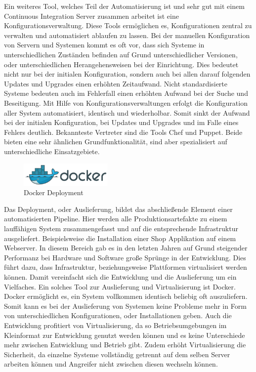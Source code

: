 Ein weiteres Tool, welches Teil der Automatisierung ist und sehr gut mit einem Continuous Integration Server zusammen arbeitet ist eine Konfigurationsverwaltung. Diese Tools ermöglichen es, Konfigurationen zentral zu verwalten und automatisiert ablaufen zu lassen. Bei der manuellen Konfiguration von Servern und Systemen kommt es oft vor, dass sich Systeme in unterschiedlichen Zuständen befinden auf Grund unterschiedlicher Versionen, oder unterschiedlichen Herangehensweisen bei der Einrichtung. Dies bedeutet nicht nur bei der initialen Konfiguration, sondern auch bei allen darauf folgenden Updates und Upgrades einen erhöhten Zeitaufwand. Nicht standardisierte Systeme bedeuten auch im Fehlerfall einen erhöhten Aufwand bei der Suche und Beseitigung. Mit Hilfe von Konfigurationsverwaltungen erfolgt die Konfiguration aller System automatisiert, identisch und wiederholbar. Somit sinkt der Aufwand bei der initialen Konfiguration, bei Updates und Upgrades und im Falle eines Fehlers deutlich. Bekannteste Vertreter sind die Tools Chef und Puppet. Beide bieten eine sehr ähnlichen Grundfunktionalität, sind aber spezialisiert auf unterschiedliche Einsatzgebiete. \parencite[Vgl.][S. 1 ff.]{krum:2014} \parencite[Vgl.][S. 8 ff.]{taylor:2014}

\begin{figure}[ht]
  \centering
  \includegraphics[width=0.4\textwidth]{img/docker_logo.png}
  \caption{Docker Deployment \parencite[][]{Docker:2016}}
  \label{fig:scrummodell}
\end{figure}

Das Deployment, oder Auslieferung, bildet das abschließende Element einer automatisierten Pipeline. Hier werden alle Produktionsartefakte zu einem lauffähigen System zusammengefasst und auf die entsprechende Infrastruktur ausgeliefert. Beispielsweise die Installation einer Shop Applikation auf einem Webserver. In diesem Bereich gab es in den letzten Jahren auf Grund steigender Performanz bei Hardware und Software große Sprünge in der Entwicklung. Dies führt dazu, dass Infrastruktur, beziehungsweise Plattformen virtualisiert werden können. Damit vereinfacht sich die Entwicklung und die Auslieferung um ein Vielfaches. Ein solches Tool zur Auslieferung und Virtualisierung ist Docker.\\
Docker ermöglicht es, ein System vollkommen identisch beliebig oft auszuliefern. Somit kann es bei der Auslieferung von Systemen keine Probleme mehr in Form von unterschiedlichen Konfigurationen, oder Installationen geben. Auch die Entwicklung profitiert von Virtualisierung, da so Betriebsumgebungen im Kleinformat zur Entwicklung genutzt werden können und es keine Unterschiede mehr zwischen Entwicklung und Betrieb gibt. Zudem erhöht Virtualisierung die Sicherheit, da einzelne Systeme vollständig getrennt auf dem selben Server arbeiten können und Angreifer nicht zwischen diesen wechseln können. \parencite[Vgl.][S. 3 ff.]{matthias:2015}


